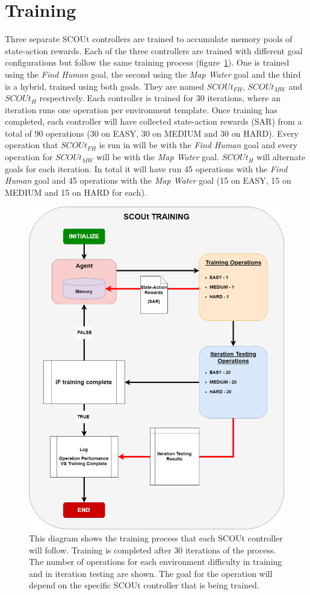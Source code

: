 \section{Training} \label{sec:training}
Three separate SCOUt controllers are trained to accumulate memory pools of state-action rewards.
Each of the three controllers are trained with different goal configurations but follow the same training process (figure~\ref{fig:training_diagram}).
One is trained using the \textit{Find Human} goal, the second using the \textit{Map Water} goal and the third is a hybrid, trained using both goals.
They are named $SCOUt_{FH}$, $SCOUt_{MW}$ and $SCOUt_{H}$ respectively.
Each controller is trained for 30 iterations, where an iteration runs one operation per environment template.
Once training has completed, each controller will have collected state-action rewards (SAR) from a total of 90 operations (30 on EASY, 30 on MEDIUM and 30 on HARD).
Every operation that $SCOUt_{FH}$ is run in will be with the \textit{Find Human} goal and every operation for $SCOUt_{MW}$ will be with the \textit{Map Water} goal.
$SCOUt_{H}$ will alternate goals for each iteration.
In total it will have run 45 operations with the \textit{Find Human} goal and 45 operations with the \textit{Map Water} goal (15 on EASY, 15 on MEDIUM and 15 on HARD for each).

\begin{figure}[H]
  \centering
  \includegraphics[width=0.7\columnwidth]{Figures/training_diagram.png}
  \caption[SCOUt Memory Training Process]{This diagram shows the training process that each SCOUt controller will follow. Training is completed after 30 iterations of the process. The number of operations for each environment difficulty in training and in iteration testing are shown. The goal for the operation will depend on the specific SCOUt controller that is being trained.}
  \label{fig:training_diagram}
\end{figure}

